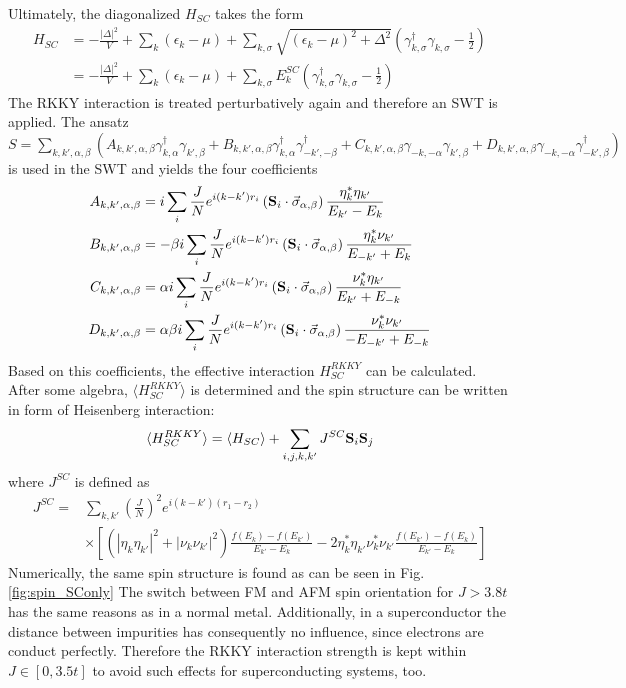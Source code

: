 Ultimately, the diagonalized $H_{SC}$ takes the form
\begin{align}\nonumber
    H_{SC} &= - \frac{|\Delta|^2}{V} + \sum_k (\epsilon_k -\mu) + \sum_{k,\sigma} \sqrt{(\epsilon_k-\mu)^2+\Delta^2} \left( \gamma^{\dag}_{k,\sigma}\gamma_{k,\sigma} - \frac{1}{2}\right) \\ \nonumber
    &=- \frac{|\Delta|^2}{V} + \sum_k (\epsilon_k -\mu) + \sum_{k, \sigma} E^{SC}_{k}\left( \gamma^{\dag}_{k,\sigma}\gamma_{k,\sigma} - \frac{1}{2}\right)
\end{align}
The RKKY interaction is treated perturbatively again and therefore an SWT is applied.
The ansatz $S=\sum_{k,k',\alpha,\beta} (A_{k,k',\alpha,\beta}\gamma^{\dag}_{k,\alpha}\gamma_{k',\beta} + B_{k,k',\alpha,\beta}\gamma^{\dag}_{k,\alpha}\gamma^{\dag}_{-k',-\beta} + C_{k,k',\alpha,\beta}\gamma_{-k,-\alpha}\gamma_{k',\beta} + D_{k,k',\alpha,\beta}\gamma_{-k,-\alpha}\gamma^{\dag}_{-k',\beta})$ is used in the SWT and yields the four coefficients
\begin{align}
    A_{k,k',\alpha,\beta} &= i\sum_i \frac{J}{N}e^{i(k-k')r_i}\left(\vb{S}_i \cdot \Vec{\sigma}_{\alpha,\beta}\right) \frac{\eta^*_k\eta_{k'}}{E_{k'}-E_{k}} \\ \nonumber
    B_{k,k',\alpha,\beta} &= -\beta i\sum_i \frac{J}{N}e^{i(k-k')r_i}\left(\vb{S}_i \cdot \Vec{\sigma}_{\alpha,\beta}\right) \frac{\eta^*_k\nu_{k'}}{E_{-k'}+E_{k}} \\ \nonumber
    C_{k,k',\alpha,\beta} &= \alpha i\sum_i \frac{J}{N}e^{i(k-k')r_i}\left(\vb{S}_i \cdot \Vec{\sigma}_{\alpha,\beta}\right) \frac{\nu^*_k\eta_{k'}}{E_{k'}+E_{-k}} \\ \nonumber
    D_{k,k',\alpha,\beta} &= \alpha \beta i\sum_i \frac{J}{N}e^{i(k-k')r_i}\left(\vb{S}_i \cdot \Vec{\sigma}_{\alpha,\beta}\right) \frac{\nu^*_k\nu_{k'}}{-E_{-k'}+E_{-k}}
\end{align}
Based on this coefficients, the effective interaction $H^{RKKY}_{SC}$ can be calculated. After some algebra, $\langle H^{RKKY}_{SC} \rangle$ is determined and the spin structure can be written in form of Heisenberg interaction:
\begin{align}
    \langle H^{RKKY}_{SC} \rangle = \langle H_{SC} \rangle + \sum_{i,j, k,k'} J^{SC} \vb{S}_i \vb{S}_j
\end{align}
where $J^{SC}$ is defined as 
\begin{align}
    J^{SC} = &\sum_{k,k'} \left( \frac{J}{N} \right)^2 e^{i(k-k')(r_1-r_2)} \\ \nonumber
    &\times \left[ \left(|\eta_k\eta_{k'}|^2 + |\nu_k\nu_{k'}|^2\right) \frac{f(E_k)-f(E_{k'})}{E_{k'}- E_k} -2\eta^*_k\eta_{k'}\nu^*_k \nu_{k'} \frac{f(E_{k'})-f(E_k)}{E_{k'}-E_k}\right]
\end{align}
Numerically, the same spin structure is found as can be seen in Fig. \ref{fig:spin_SConly}
The switch between FM and AFM spin orientation for $J>3.8t$ has the same reasons as in a normal metal.
Additionally, in a superconductor the distance between impurities has consequently no influence, since electrons are conduct perfectly.\newline
Therefore the RKKY interaction strength is kept within $J\in [0, 3.5t]$ to avoid such effects for superconducting systems, too.

